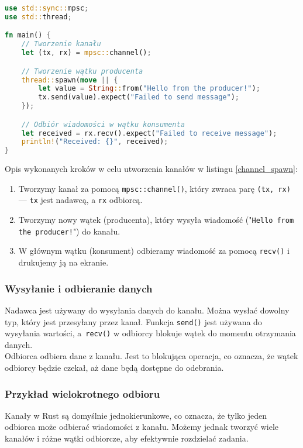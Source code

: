 \begin{lstlisting}[language=Rust, caption=Przykład tworzenia kanału, label=channel_spawn]
use std::sync::mpsc;
use std::thread;

fn main() {
    // Tworzenie kanału
    let (tx, rx) = mpsc::channel();

    // Tworzenie wątku producenta
    thread::spawn(move || {
        let value = String::from("Hello from the producer!");
        tx.send(value).expect("Failed to send message");
    });

    // Odbiór wiadomości w wątku konsumenta
    let received = rx.recv().expect("Failed to receive message");
    println!("Received: {}", received);
}
\end{lstlisting}
Opis wykonanych kroków w celu utworzenia kanałów w listingu \ref{channel_spawn}:
\begin{enumerate}
    \item Tworzymy kanał za pomocą \texttt{mpsc::channel()}, który zwraca parę \texttt{(tx, rx)} — \texttt{tx} jest nadawcą, a \texttt{rx} odbiorcą.
    \item Tworzymy nowy wątek (producenta), który wysyła wiadomość ("\texttt{Hello from the producer!}") do kanału.
    \item W głównym wątku (konsument) odbieramy wiadomość za pomocą \texttt{recv()} i drukujemy ją na ekranie.
\end{enumerate}

\subsubsection{Wysyłanie i odbieranie danych}
Nadawca jest używany do wysyłania danych do kanału. Można wysłać dowolny typ, który jest przesyłany przez kanał. Funkcja \texttt{send()} jest używana do wysyłania wartości, a~\texttt{recv()} w odbiorcy blokuje wątek do momentu otrzymania danych.\\
Odbiorca odbiera dane z kanału. Jest to blokująca operacja, co oznacza, że wątek odbiorcy będzie czekał, aż dane będą dostępne do odebrania.

\subsubsection{Przykład wielokrotnego odbioru}
Kanały w Rust są domyślnie jednokierunkowe, co oznacza, że tylko jeden odbiorca może odbierać wiadomości z kanału. Możemy jednak tworzyć wiele kanałów i różne wątki odbiorcze, aby efektywnie rozdzielać zadania.

